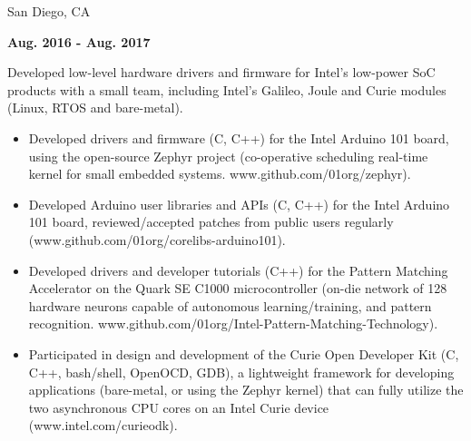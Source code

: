 \documentclass[6pt]{article}
\begin{document}
\begin{minipage}{35em}
\begin{minipage}{20em}
{San Diego, CA}
\end{minipage}
\hfill
\begin{minipage}{12em}
{\bfseries Aug. 2016 - Aug. 2017}
\end{minipage}
\break
\break
Developed low-level hardware drivers and firmware for Intel's low-power SoC products
with a small team, including Intel's Galileo, Joule and Curie modules (Linux, RTOS and
bare-metal).
\begin{itemize}
    \item Developed drivers and firmware (C, C++) for the Intel Arduino 101 board, using the
          open-source Zephyr project (co-operative scheduling real-time kernel for small
          embedded systems. www.github.com/01org/zephyr).
    \item Developed Arduino user libraries and APIs (C, C++) for the Intel Arduino 101 board,
          reviewed/accepted patches from public users regularly \\
          (www.github.com/01org/corelibs-arduino101).
    \item Developed drivers and developer tutorials (C++) for the Pattern Matching Accelerator
          on the Quark SE C1000 microcontroller (on-die network of 128 hardware neurons
          capable of autonomous learning/training, and pattern recognition.
          www.github.com/01org/Intel-Pattern-Matching-Technology).
    \item Participated in design and development of the Curie Open Developer Kit (C, C++,
          bash/shell, OpenOCD, GDB), a lightweight framework for developing applications
          (bare-metal, or using the Zephyr kernel) that can fully utilize the two asynchronous
          CPU cores on an Intel Curie device (www.intel.com/curieodk).
\end{itemize}
\end{minipage}
%
%
\hspace{2em}
\end{document}
